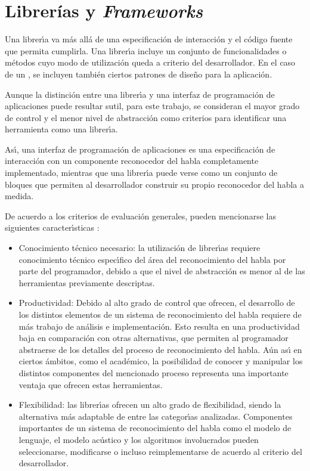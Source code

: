 \section{Librer\'ias y \emph{Frameworks}}
\label{sec:librerias}

Una librer{\'\i}a va m\'as all\'a de una especificaci\'on de interacci\'on y el c\'odigo fuente que permita cumplirla.
Una librer{\'\i}a incluye un conjunto de funcionalidades o m\'etodos cuyo modo de utilizaci\'on queda a criterio
del desarrollador. En el caso de un , se incluyen tambi\'en ciertos patrones de dise\~no para la aplicaci\'on.

Aunque la distinci\'on entre una librer{\'\i}a y una interfaz de programaci\'on de aplicaciones puede resultar
sutil, para este trabajo, se consideran el mayor grado de control y el menor nivel de abstracci\'on
como criterios para identificar una herramienta como una librer{\'\i}a.

As{\'\i}, una interfaz de programaci\'on de aplicaciones es una especificaci\'on de interacci\'on con un componente
reconocedor del habla completamente implementado, mientras que una librer{\'\i}a puede verse como un conjunto
de bloques que permiten al desarrollador construir su propio reconocedor del habla a medida.

De acuerdo a los criterios de evaluaci\'on generales, pueden mencionarse las 
siguientes caracter{\'\i}sticas :

\begin{itemize}
 	\item Conocimiento t\'ecnico necesario: la utilizaci\'on de librer{\'\i}as requiere conocimiento t\'ecnico
 	espec{\'\i}fico del \'area del reconocimiento del habla por parte del programador, debido a que el nivel de
 	abstracci\'on es menor al de las herramientas previamente descriptas.
 	\item Productividad: Debido al alto grado de control que ofrecen, el desarrollo de los distintos
 	elementos de un sistema de reconocimiento del habla requiere de m\'as trabajo de an\'alisis e implementaci\'on.
 	Esto resulta en una productividad baja en comparaci\'on con otras alternativas, que permiten al
 	programador abstraerse de los detalles del proceso de reconocimiento del habla.
 	A\'un as{\'\i} en ciertos \'ambitos, como el acad\'emico, la posibilidad de conocer y manipular los distintos
 	componentes del mencionado proceso representa una importante ventaja que ofrecen estas herramientas.
 	\item Flexibilidad: las librer{\'\i}as ofrecen un alto grado de flexibilidad, siendo la alternativa
 	m\'as adaptable de entre las categor{\'\i}as analizadas. Componentes importantes de un sistema
 	de reconocimiento del habla como el modelo de lenguaje, el modelo ac\'ustico y los algoritmos involucrados
 	pueden seleccionarse, modificarse o incluso reimplementarse de acuerdo al criterio del desarrollador.
 \end{itemize}

